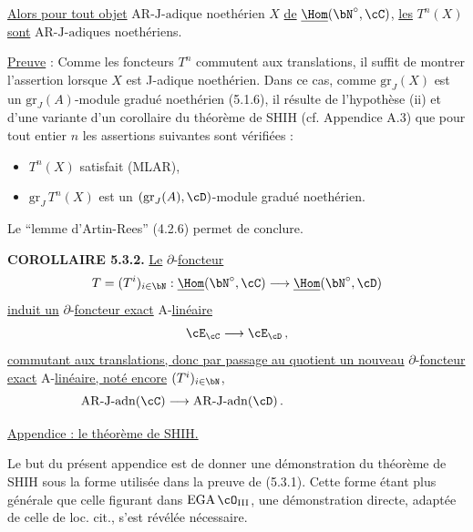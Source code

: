 \hspace*{\parindent}
\underline{Alors pour tout objet} $\mathrm{AR\text{-}J\text{-}adique}$ noeth\'erien $X$ \underline{de} $\underline{\Hom}(\bN^{\circ}, \cC)$, \underline{les} $T^n(X)$ \underline{sont} $\mathrm{AR\text{-}J\text{-}adiques}$ noeth\'eriens.

\newpage

\noindent
\underline{Preuve} : Comme les foncteurs $T^n$ commutent aux translations, il suffit de montrer l'assertion lorsque $X$ est J-adique noeth\'erien. Dans ce cas, comme $\mathrm{gr}_J(X)$ est un $\mathrm{gr}_J(A)$-module gradu\'e noeth\'erien (5.1.6), il r\'esulte de l'hypoth\`ese (ii) et d'une variante d'un corollaire du th\'eor\`eme de SHIH (cf. Appendice A.3) que pour tout entier $n$ les assertions suivantes sont v\'erifi\'ees :
\begin{itemize}
\item[(a)] $T^n(X)$ satisfait (MLAR),
\item[(b)] $\mathrm{gr}_J\,T^n(X)$ est un $(\mathrm{gr}_J(A), \cD)$-module gradu\'e noeth\'erien.
\end{itemize}

Le ``lemme d'Artin-Rees'' (4.2.6) permet de conclure.

\bigskip

\noindent
\textbf{COROLLAIRE 5.3.2.} \underline{Le} $\partial$-\underline{foncteur}
\[
T = (T^i)_{i \in \bN} : \underline{\Hom}(\bN^{\circ}, \cC) \longrightarrow \underline{\Hom}(\bN^{\circ}, \cD)
\]
\underline{induit un} $\partial$-\underline{foncteur exact} A-\underline{lin\'eaire}
\[
\cE_{\cC} \longrightarrow \cE_{\cD}\,,
\]
\underline{commutant aux translations, donc par passage au quotient un nouveau} $\partial$-\underline{foncteur exact} A-\underline{lin\'eaire, not\'e encore} $(T^i)_{i \in \bN}$,
\[
\mathrm{AR\text{-}J\text{-}adn}(\cC) \longrightarrow \mathrm{AR\text{-}J\text{-}adn}(\cD)\,.\hspace*{3cm}
\]

\newpage

\begin{center}
\underline{Appendice : le th\'eor\`eme de SHIH.}
\end{center}

Le but du pr\'esent appendice est de donner une d\'emonstration du th\'eor\`eme de SHIH sous la forme utilis\'ee dans la preuve de (5.3.1). Cette forme \'etant plus g\'en\'erale que celle figurant dans $\mathrm{EGA}\,\cO_{\mathrm{III}}$, une d\'emonstration directe, adapt\'ee de celle de loc. cit., s'est r\'ev\'el\'ee n\'ecessaire.


